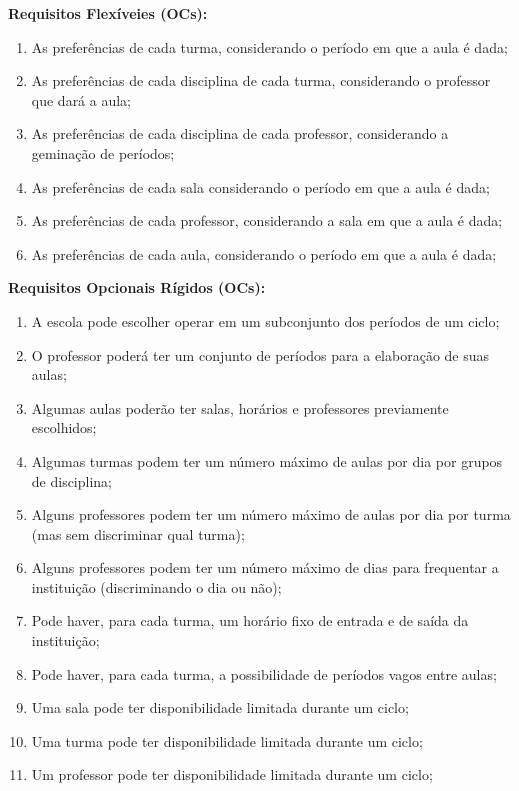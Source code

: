 \documentclass[12pt,a4paper]{article}
\begin{document}
			\textbf{Requisitos Flexíveies (OCs):}
			\begin{enumerate}
				\item As preferências de cada turma, considerando o período em que a aula é dada;
				\item As preferências de cada disciplina de cada turma, considerando o professor que dará a aula;
				\item As preferências de cada disciplina de cada professor, considerando a geminação de períodos;
				\item As preferências de cada sala considerando o período em que a aula é dada;
				\item As preferências de cada professor, considerando a sala em que a aula é dada;
				\item As preferências de cada aula, considerando o período em que a aula é dada;
			\end{enumerate}

			\textbf{Requisitos Opcionais Rígidos (OCs):}
			\begin{enumerate}
				\item A escola pode escolher operar em um subconjunto dos períodos de um ciclo;
				\item O professor poderá ter um conjunto de períodos para a elaboração de suas aulas;
				\item Algumas aulas poderão ter salas, horários e professores previamente escolhidos;
				\item Algumas turmas podem ter um número máximo de aulas por dia por grupos de disciplina;
				\item Alguns professores podem ter um número máximo de aulas por dia por turma (mas sem discriminar qual turma);
				\item Alguns professores podem ter um número máximo de dias para frequentar a instituição (discriminando o dia ou não);
				\item Pode haver, para cada turma, um horário fixo de entrada e de saída da instituição;
				\item Pode haver, para cada turma, a possibilidade de períodos vagos entre aulas;
				\item Uma sala pode ter disponibilidade limitada durante um ciclo;
				\item Uma turma pode ter disponibilidade limitada durante um ciclo;
				\item Um professor pode ter disponibilidade limitada durante um ciclo;
			\end{enumerate}
	\newpage
\end{document}
